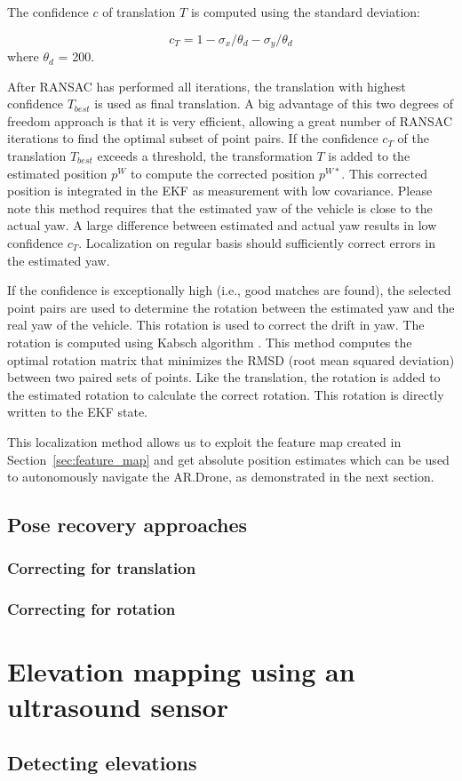 The confidence $c$ of translation $T$ is computed using the standard deviation:

\begin{equation}
c_{T} = 1 -   \sigma_x / \theta_{d} -  \sigma_y / \theta_{d}
\end{equation}
where $\theta_d$ = 200.

After RANSAC has performed all iterations, the translation with highest confidence $T_{best}$ is used as final translation.
A big advantage of this two degrees of freedom approach is that it is very efficient, allowing a great number of RANSAC iterations to find the optimal subset of point pairs.
If the confidence $c_{T}$ of the translation $T_{best}$ exceeds a threshold, the transformation $T$ is added to the estimated position $p^W$ to compute the corrected position $p^{W*}$. This corrected position is integrated in the EKF as measurement with low covariance.
Please note this method requires that the estimated yaw of the vehicle is close to the actual yaw.
A large difference between estimated and actual yaw results in low confidence $c_T$.
Localization on regular basis should sufficiently correct errors in the estimated yaw.

If the confidence is exceptionally high (i.e., good matches are found), the selected point pairs are used to determine the rotation between the estimated yaw and the real yaw of the vehicle. This rotation is used to correct the drift in yaw.
The rotation is computed using Kabsch algorithm \cite{Kabsch:a12999}.
This method computes the optimal rotation matrix that minimizes the RMSD (root mean squared deviation) between two paired sets of points.
Like the translation, the rotation is added to the estimated rotation to calculate the correct rotation. This rotation is directly written to the EKF state.

This localization method allows us to exploit the feature map created in Section~\ref{sec:feature_map} and get absolute position estimates which can be used to autonomously navigate the AR.Drone, as demonstrated in the next section.


		\subsection{Pose recovery approaches}
			\subsubsection{Correcting for translation}
			\subsubsection{Correcting for rotation}
	\section{Elevation mapping using an ultrasound sensor}
		\subsection{Detecting elevations}
